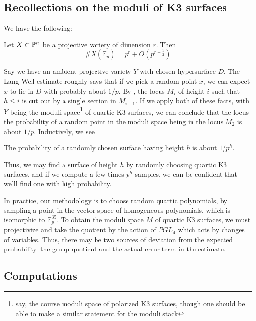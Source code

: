 \subsection{Recollections on the moduli of K3 surfaces}

We have the following:

\begin{thm}
	Let \(X \subset \mathbb{P}^{n}\)
	be a projective variety of dimension \(r\). 
	Then 
	\[
		\#X(\mathbb{F}_{p}) = p^r + O(p^{r - \frac{1}{2}})
	\] 
\end{thm}

Say we have an ambient projective variety
\(Y\) with chosen
hypersurface \(D\).
The Lang-Weil estimate roughly
says that if we pick a random point \(x\),
we can expect \(x\) to lie in \(D\) 
with probably about \(1 / p\).
By \cite[Section~7]{artin-1974-k3-surfaces}, 
the locus \(M_{i}\) of height \(i\) such that \(h \leq i\)
is cut out by a single section in 
\(M_{i-1}\).
If we apply both of these facts,
with \(Y\) being the 
moduli space\footnote{
	say, the course moduli space of polarized K3 surfaces,
	though one should be able to make a similar statement
	for the moduli stack
} of quartic K3 surfaces,
we can conclude that the locus 
the probability of a random point 
in the moduli space being in the locus
\(M_{2}\) is about \(1 / p\). 
Inductively, we see 

\begin{heur}
The probability of a randomly
chosen surface having height \(h\) is about \(1 / p^{h}\).
\end{heur}

Thus, we may find a surface of height \(h\) by 
randomly choosing quartic K3 surfaces, and 
if we compute a few times \(p^{h}\) 
samples, we can be confident that we'll find
one with high probability.

In practice, our methodology is to choose
random quartic polynomials,
by sampling a point in the vector space
of homogeneous polynomials, which is isomorphic to
\(\mathbb{F}_{p}^{35}\).
To obtain the moduli space \(M\) of quartic K3 surfaces, 
we must projectivize and take the quotient by the action of 
\(PGL_{4}\) which acts by changes of variables. 
Thus, there may be two sources of deviation from the expected
probability--the group quotient and the actual 
error term in the estimate.

\subsection{Computations}

